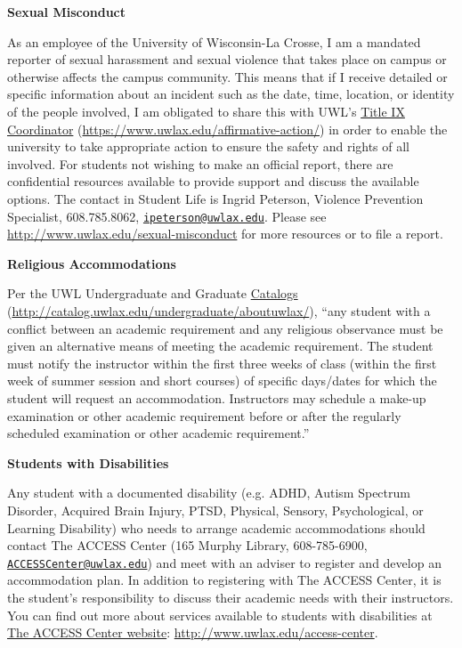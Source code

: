 \documentclass[10pt]{article}
\newcommand{\bulurl}[1]{\url{#1}}
\newcommand{\toprule}{\par\vspace*{5pt}\noindent{\hrule\hfill}\par\vspace*{1pt}}
\newcommand{\botrule}{\par\noindent{\hrule\hfill}\par}
\begin{document}
\botrule \textbf{Sexual Misconduct} \toprule
As an employee of the University of Wisconsin-La Crosse, I am a mandated reporter of sexual harassment and sexual violence that takes place on campus or otherwise affects the campus community. This means that if I receive detailed or specific information about an incident such as the date, time, location, or identity of the people involved, I am obligated to share this with UWL's \href{https://www.uwlax.edu/affirmative-action/}{Title IX Coordinator} (\bulurl{https://www.uwlax.edu/affirmative-action/}) in order to enable the university to take appropriate action to ensure the safety and rights of all involved. For students not wishing to make an official report, there are confidential resources available to provide support and discuss the available options. The contact in Student Life is Ingrid Peterson, Violence Prevention Specialist, 608.785.8062, \texttt{\href{mailto:ipeterson@uwlax.edu}{ipeterson@uwlax.edu}}. Please see \bulurl{http://www.uwlax.edu/sexual-misconduct} for more resources or to file a report.\\

\botrule \textbf{Religious Accommodations} \toprule
Per the UWL Undergraduate and Graduate \href{http://catalog.uwlax.edu/undergraduate/aboutuwlax/}{Catalogs} (\bulurl{http://catalog.uwlax.edu/undergraduate/aboutuwlax/}), ``any student with a conflict between an academic requirement and any religious observance must be given an alternative means of meeting the academic requirement. The student must notify the instructor within the first three weeks of class (within the first week of summer session and short courses) of specific days/dates for which the student will request an accommodation. Instructors may schedule a make-up examination or other academic requirement before or after the regularly scheduled examination or other academic requirement.''\\

\botrule \textbf{Students with Disabilities} \toprule
Any student with a documented disability (e.g. ADHD, Autism Spectrum Disorder, Acquired Brain Injury, PTSD, Physical, Sensory, Psychological, or Learning Disability) who needs to arrange academic accommodations should contact The ACCESS Center (165 Murphy Library, 608-785-6900, \texttt{\href{mailto:ACCESSCenter@uwlax.edu}{ACCESSCenter@uwlax.edu}}) and meet with an adviser to register and develop an accommodation plan.  In addition to registering with The ACCESS Center, it is the student's responsibility to discuss their academic needs with their instructors.  You can find out more about services available to students with disabilities at \href{http://www.uwlax.edu/access-center}{The ACCESS Center website}: \bulurl{http://www.uwlax.edu/access-center}.\\
\end{document}
